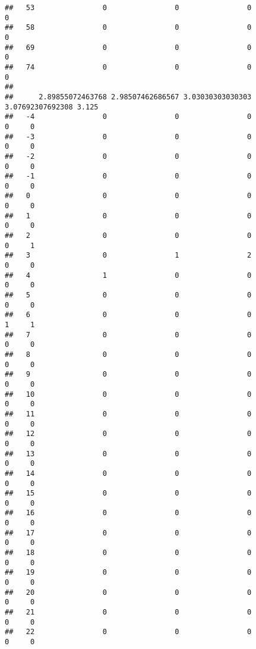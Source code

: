 \documentclass[]{article}
\begin{document}
\begin{verbatim}
##   53                0                0                0                0
##   58                0                0                0                0
##   69                0                0                0                0
##   74                0                0                0                0
##     
##      2.89855072463768 2.98507462686567 3.03030303030303 3.07692307692308 3.125
##   -4                0                0                0                0     0
##   -3                0                0                0                0     0
##   -2                0                0                0                0     0
##   -1                0                0                0                0     0
##   0                 0                0                0                0     0
##   1                 0                0                0                0     0
##   2                 0                0                0                0     1
##   3                 0                1                2                0     0
##   4                 1                0                0                0     0
##   5                 0                0                0                0     0
##   6                 0                0                0                1     1
##   7                 0                0                0                0     0
##   8                 0                0                0                0     0
##   9                 0                0                0                0     0
##   10                0                0                0                0     0
##   11                0                0                0                0     0
##   12                0                0                0                0     0
##   13                0                0                0                0     0
##   14                0                0                0                0     0
##   15                0                0                0                0     0
##   16                0                0                0                0     0
##   17                0                0                0                0     0
##   18                0                0                0                0     0
##   19                0                0                0                0     0
##   20                0                0                0                0     0
##   21                0                0                0                0     0
##   22                0                0                0                0     0

\end{verbatim}
\end{document}
